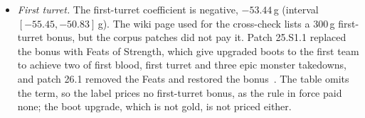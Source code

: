 \begin{itemize}
  In the corpus patches an inner turret therefore paid more local gold than an outer or an inhibitor
  turret, so the regression's ranking of the inner turret first does not contradict the rule in
  force. The comparison is one of order only. The wiki page shares local gold only among living
  champions near the turret when it falls and champions that helped destroy it, and plates are
  priced as separate events, so the rule fixes no single team-gold amount against which a turret
  coefficient could be checked.
\item \emph{First turret.} The first-turret coefficient is negative, $-53.44$\,g (interval
  $[-55.45, -50.83]$\,g). The wiki page used for the cross-check lists a 300\,g first-turret bonus,
  but the corpus patches did not pay it. Patch 25.S1.1 replaced the bonus with Feats of Strength,
  which give upgraded boots to the first team to achieve two of first blood, first turret and three
  epic monster takedowns, and patch 26.1 removed the Feats and restored the
  bonus~\cite{riot2025patch25s11,riot2026patch261,lolwiki2026turret}. The table omits the term, so
  the label prices no first-turret bonus, as the rule in force paid none; the boot upgrade, which is
  not gold, is not priced either.

\end{itemize}
